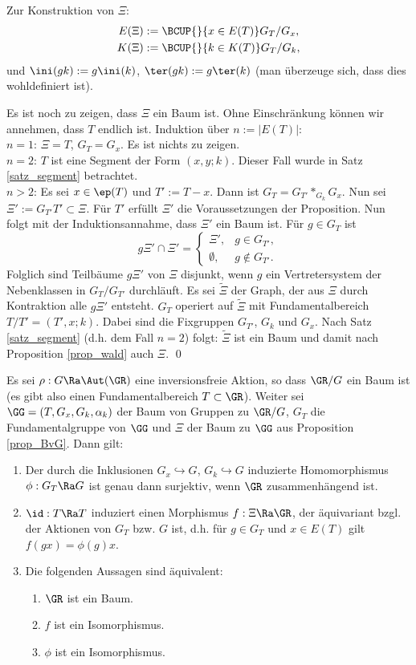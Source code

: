 \bew Zur Konstruktion von $\Xi$:
\begin{align*}
E(\Xi) &:= \BCUP{}{x\in E(T)} G_T/G_x, \\
K(\Xi) &:= \BCUP{}{k\in K(T)} G_T/G_k,
\end{align*}
und $\ini(gk):=g \ini(k)$, $\ter(gk):=g \ter(k)$ (man überzeuge sich,
dass dies wohldefiniert ist).

Es ist noch zu zeigen, dass $\Xi$ ein Baum ist. Ohne Einschränkung
können wir annehmen, dass $T$ endlich ist. Induktion über
$n:=|E(T)|$:\\
$n=1$: $\Xi=T$, $G_T=G_x$. Es ist nichts zu zeigen.\\
$n=2$: $T$ ist eine Segment der Form $(x,y;k)$. Dieser Fall wurde
in Satz \ref{satz_segment} betrachtet.\\
$n>2$: Es sei $x\in \ep(T)$ und $T':=T-x$. Dann ist
$G_T=G_{T'}*_{G_k} G_x$. Nun sei $\Xi' := G_{T'} T' \subset \Xi$.
Für $T'$ erfüllt $\Xi'$ die Voraussetzungen der Proposition.
Nun folgt mit der Induktionsannahme, dass $\Xi'$ ein Baum ist.
Für $g\in G_T$ ist
\[
g\Xi' \cap \Xi' =
\left\{
\begin{matrix}
\Xi', &  g\in G_{T'}, \\
\emptyset, & g\not\in G_{T'}.
\end{matrix}\right.
\]
Folglich sind Teilbäume $g\Xi'$ von $\Xi$ disjunkt, wenn $g$ ein
Vertretersystem der Nebenklassen in $G_T/G_{T'}$ durchläuft.
Es sei $\tilde{\Xi}$ der Graph, der aus $\Xi$ durch
Kontraktion alle $g \Xi'$ entsteht. $G_T$ operiert auf $\tilde{\Xi}$
mit Fundamentalbereich $T/T'=(T',x;k)$.
Dabei sind die Fixgruppen $G_{T'}$, $G_k$ und $G_x$.
Nach Satz \ref{satz_segment} (d.h. dem Fall $n=2$) folgt:
$\tilde{\Xi}$ ist ein Baum und damit nach
Proposition \ref{prop_wald} auch $\Xi$.
\qed

\PROP \label{prop_fundbereich}
Es sei $\rho:G\Ra\Aut(\GR)$ eine inversionsfreie Aktion,
so dass $\GR/G$ ein Baum ist (es gibt also einen Fundamentalbereich
$T\subset \GR$).
Weiter sei $\GG=(T,G_x,G_k,\alpha_k)$ der Baum von Gruppen zu
$\GR/G$, $G_T$ die Fundamentalgruppe von $\GG$ und $\Xi$ der
Baum zu $\GG$ aus Proposition \ref{prop_BvG}. Dann gilt:
\begin{enumerate}
\item Der durch die Inklusionen $G_x \hookrightarrow G$,
$G_k \hookrightarrow G$ induzierte Homomorphismus
$\phi:G_T \Ra G$ ist genau dann surjektiv, wenn $\GR$
zusammenhängend ist.
\item $\id:T\Ra T$ induziert einen Morphismus $f:\Xi\Ra\GR$,
der äquivariant bzgl. der Aktionen von
$G_T$ bzw. $G$ ist, d.h. für $g\in G_T$ und $x\in E(T)$ gilt
$f(gx)=\phi(g)x$.
\item Die folgenden Aussagen sind äquivalent:
\begin{enumerate}
\item $\GR$ ist ein Baum.
\item $f$ ist ein Isomorphismus.
\item $\phi$ ist ein Isomorphismus.
\end{enumerate}
\end{enumerate}

